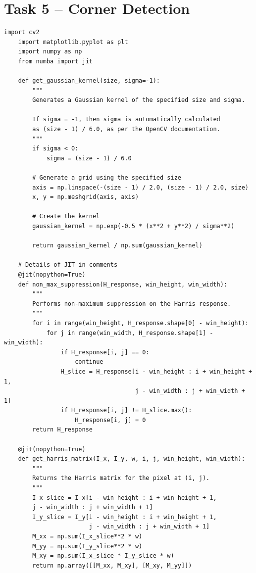 \documentclass[11pt,a4paper]{article}
\begin{document}
\section{Task 5 -- Corner Detection}
\begin{lstlisting}[language=iPython, title=Python Code for Corner Detection]
    import cv2
    import matplotlib.pyplot as plt
    import numpy as np
    from numba import jit
    
    def get_gaussian_kernel(size, sigma=-1):
        """
        Generates a Gaussian kernel of the specified size and sigma.
    
        If sigma = -1, then sigma is automatically calculated
        as (size - 1) / 6.0, as per the OpenCV documentation.
        """
        if sigma < 0:
            sigma = (size - 1) / 6.0
    
        # Generate a grid using the specified size
        axis = np.linspace(-(size - 1) / 2.0, (size - 1) / 2.0, size)
        x, y = np.meshgrid(axis, axis)
    
        # Create the kernel
        gaussian_kernel = np.exp(-0.5 * (x**2 + y**2) / sigma**2)
    
        return gaussian_kernel / np.sum(gaussian_kernel)
    
    # Details of JIT in comments
    @jit(nopython=True)
    def non_max_suppression(H_response, win_height, win_width):
        """
        Performs non-maximum suppression on the Harris response.
        """
        for i in range(win_height, H_response.shape[0] - win_height):
            for j in range(win_width, H_response.shape[1] - win_width):
                if H_response[i, j] == 0:
                    continue
                H_slice = H_response[i - win_height : i + win_height + 1,
                                     j - win_width : j + win_width + 1]
                if H_response[i, j] != H_slice.max():
                    H_response[i, j] = 0
        return H_response

    @jit(nopython=True)
    def get_harris_matrix(I_x, I_y, w, i, j, win_height, win_width):
        """
        Returns the Harris matrix for the pixel at (i, j).
        """
        I_x_slice = I_x[i - win_height : i + win_height + 1,
        j - win_width : j + win_width + 1]
        I_y_slice = I_y[i - win_height : i + win_height + 1,
                        j - win_width : j + win_width + 1]
        M_xx = np.sum(I_x_slice**2 * w)
        M_yy = np.sum(I_y_slice**2 * w)
        M_xy = np.sum(I_x_slice * I_y_slice * w)
        return np.array([[M_xx, M_xy], [M_xy, M_yy]])
    

\end{lstlisting}
\end{document}

